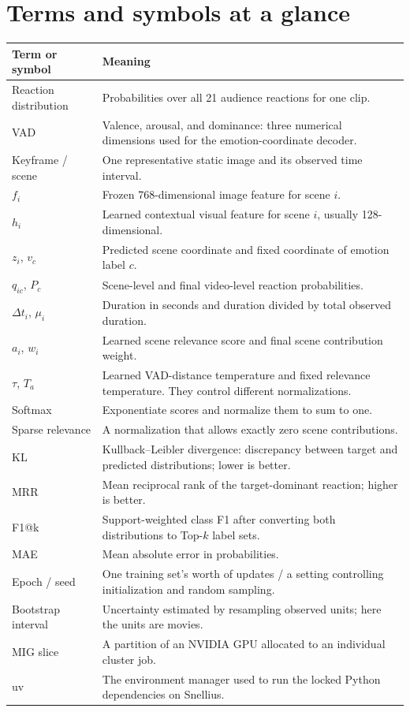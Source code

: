 \documentclass[11pt,a4paper]{article}
\begin{document}
\clearpage
\section{Terms and symbols at a glance}
\begin{longtable}{p{3.7cm}p{11.5cm}}\toprule
Term or symbol & Meaning\\\midrule\endhead
Reaction distribution & Probabilities over all 21 audience reactions for one clip.\\
VAD & Valence, arousal, and dominance: three numerical dimensions used for the emotion-coordinate decoder.\\
Keyframe / scene & One representative static image and its observed time interval.\\
$f_i$ & Frozen 768-dimensional image feature for scene $i$.\\
$h_i$ & Learned contextual visual feature for scene $i$, usually 128-dimensional.\\
$z_i$, $v_c$ & Predicted scene coordinate and fixed coordinate of emotion label $c$.\\
$q_{ic}$, $P_c$ & Scene-level and final video-level reaction probabilities.\\
$\Delta t_i$, $\mu_i$ & Duration in seconds and duration divided by total observed duration.\\
$a_i$, $w_i$ & Learned scene relevance score and final scene contribution weight.\\
$\tau$, $T_a$ & Learned VAD-distance temperature and fixed relevance temperature. They control different normalizations.\\
Softmax & Exponentiate scores and normalize them to sum to one.\\
Sparse relevance & A normalization that allows exactly zero scene contributions.\\
KL & Kullback--Leibler divergence: discrepancy between target and predicted distributions; lower is better.\\
MRR & Mean reciprocal rank of the target-dominant reaction; higher is better.\\
F1@k & Support-weighted class F1 after converting both distributions to Top-$k$ label sets.\\
MAE & Mean absolute error in probabilities.\\
Epoch / seed & One training set's worth of updates / a setting controlling initialization and random sampling.\\
Bootstrap interval & Uncertainty estimated by resampling observed units; here the units are movies.\\
MIG slice & A partition of an NVIDIA GPU allocated to an individual cluster job.\\
uv & The environment manager used to run the locked Python dependencies on Snellius.\\\bottomrule
\end{longtable}
\end{document}
